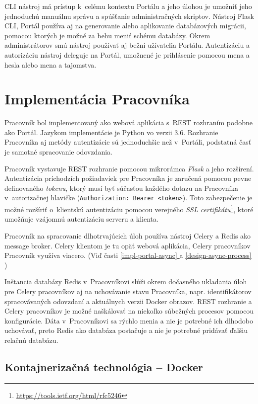\documentclass[
  digital, %
  oneside, %
  table,   %
  lof,     %
  lot,   %
]{fithesis3}
\newcommand*{\fullref}[1]{\hyperref[{#1}]{\ref*{#1} \nameref*{#1}}}
\newcommand*{\footurl}[1]{\footnote{\url{#1}}}
\begin{document}
CLI nástroj má prístup k~celému kontextu Portálu a jeho úlohou je umožniť jeho jednoduchú manuálnu správu a spúšťanie administračných skriptov. Nástroj Flask CLI, Portál používa aj na generovanie alebo aplikovanie databázových migrácii, pomocou ktorých je možné za behu meniť schému databázy. Okrem administrátorov smú nástroj používať aj bežní užívatelia Portálu. Autentizáciu a autorizáciu nástroj deleguje na Portál, umožnené je prihlásenie pomocou mena a hesla alebo mena a tajomstva.

\section{Implementácia Pracovníka}

Pracovník bol implementovaný ako webová aplikácia s~REST rozhraním podobne ako Portál. Jazykom implementácie je Python vo verzii 3.6. Rozhranie Pracovníka aj metódy autentizácie sú jednoduchšie než v~Portáli, podstatná časť je samotné spracovanie odovzdania.

Pracovník vystavuje REST rozhranie pomocou mikrorámca \emph{Flask} a jeho rozšírení. Autentizácia príchodzích požiadaviek pre Pracovníka je zaručená pomocou pevne definovaného \emph{tokenu}, ktorý musí byť súčasťou každého dotazu na Pracovníka v~autorizačnej hlavičke (\texttt{Authorization: Bearer <token>}). Toto zabezpečenie je možné rozšíriť o~klientskú autentizáciu pomocou verejného \emph{SSL certifikátu}\footurl{https://tools.ietf.org/html/rfc5246}, ktoré umožňuje vzájomnú autentizáciu serveru a klienta. 

Pracovník na spracovanie dlhotrvajúcich úloh používa nástroj Celery a Redis ako message broker. Celery klientom je tu opäť webová aplikácia, Celery pracovníkov Pracovník využíva viacero. (Viď časti \fullref{impl-portal-async} a \fullref{design-async-process})

Inštancia databázy Redis v~Pracovníkovi slúži okrem dočasného ukladania úloh pre Celery pracovníkov aj na uchovávanie stavu Pracovníka, napr. identifikátorov spracovávaných odovzdaní a aktuálnych verzii Docker obrazov. REST rozhranie a Celery pracovníkov je možné naškálovať na niekoľko súbežných procesov pomocou konfigurácie. Dáta v~Pracovníkovi sa rýchlo menia a nie je potrebné ich dlhodobo uchovávať, preto Redis ako databáza postačuje a nie je potrebné pridávať ďalšiu relačnú databázu.

\subsection{Kontajnerizačná technológia -- Docker}
\end{document}
